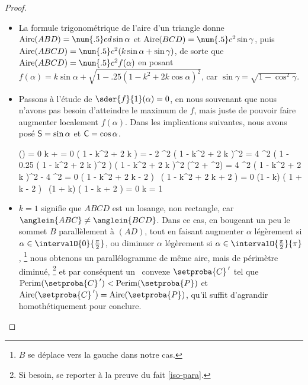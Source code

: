 \begin{proof}
\begin{itemize}
	    \item La formule trigonométrique de l'aire d'un triangle donne
	    $\area{ABD} = \num{.5} c d \sin \alpha$
	    et
	    $\area{BCD} = \num{.5} c^2 \sin \gamma$,
	   	puis
	    $\area{ABCD} = \num{.5} c^2 ( k \sin \alpha + \sin \gamma )$,
	    de sorte que
    	$\area{ABCD} = \num{.5} c^2 f(\alpha)$
    	en posant 
    	$f(\alpha) = k \sin \alpha + \sqrt{1 - \num{.25} ( 1 - k^2 + 2 k \cos \alpha)^2}$,
	    car 
	    $\sin \gamma = \sqrt{1 - \cos^2 \gamma}$.


	    \item Passons à l'étude de $\sder{f}{1}(\alpha) = 0$, en nous souvenant que nous n'avons pas besoin d'atteindre le maximum de $f$, mais juste de pouvoir faire augmenter localement $f(\alpha)$. 
	    Dans les implications suivantes, nous avons posé 
	    $\mathsf{S} = \sin \alpha$ et $\mathsf{C} = \cos \alpha$.
	    
	    \noindent
	    \begin{stepcalc}[style=ar*, ope={\implies[d'où]}]
	        (\alpha) = 0
	    \explnext{}
	        k 
	        +
	        =
	        0
	    \explnext{}
	         ( 1 - k^2 + 2 k ) 
	        =
	        - 2  
	    \explnext{}
	        ^2 ( 1 - k^2 + 2 k )^2
	        =
	        4 ^2 \big( 1 - \num{.25} ( 1 - k^2 + 2 k )^2 \big)
	    \explnext{}
	        ( 1 - k^2 + 2 k )^2 (^2 + ^2)
	        =
	        4 ^2
	        ( 1 - k^2 + 2 k )^2 - 4 ^2 = 0
	    \explnext{}
	        ( 1 - k^2 + 2 k  - 2  )
	        \,
	        ( 1 - k^2 + 2 k  + 2  )
	        = 0
	    \explnext{}
	        (1 - k) ( 1 + k - 2  )
	        \,
	        (1 + k) ( 1 - k + 2  ) = 0
	        k = 1
	        \,\,  \,\,
	         \in {}
	    \end{stepcalc}


	    \item $k = 1$ signifie que $ABCD$ est un losange, non rectangle, car $\anglein{ABC} \neq \anglein{BCD}$.
	    Dans ce cas, en bougeant un peu le sommet $B$ parallèlement à $(AD)$, tout en faisant
	    augmenter $\alpha$ légèrement si $\alpha \in \intervalO{0}{\frac{\pi}{2}}$,
	    ou
	    diminuer $\alpha$ légèrement si $\alpha \in \intervalO{\frac{\pi}{2}}{\pi}$,%
	    \footnote{
	        $B$ se déplace vers la gauche dans notre cas.
	    }
	    nous obtenons un parallélogramme de même aire, mais de périmètre diminué,%
	    \footnote{
	        Si besoin, se reporter à la preuve du fait \ref{iso-para}.
	    }
	    et par conséquent un \ngone\ convexe $\primeit{\setproba{C}}$ tel que
		$\perim{\primeit{\setproba{C}}} < \perim{\setproba{P}}$
		et
		$\area{\primeit{\setproba{C}}} = \area{\setproba{P}}$,
		qu'il suffit d'agrandir homothétiquement pour conclure.



\end{itemize}
\end{proof}
